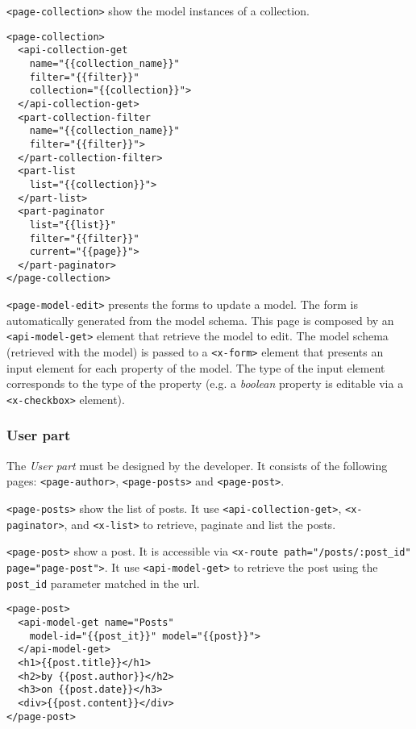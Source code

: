 \texttt{<page-collection>} show the model instances of a collection.

\begin{lstlisting}[language=HTML5]
<page-collection>
  <api-collection-get 
    name="{{collection_name}}" 
    filter="{{filter}}"
    collection="{{collection}}">
  </api-collection-get>
  <part-collection-filter 
    name="{{collection_name}}"  
    filter="{{filter}}">
  </part-collection-filter>
  <part-list 
    list="{{collection}}">
  </part-list>
  <part-paginator 
    list="{{list}}" 
    filter="{{filter}}"
    current="{{page}}">
  </part-paginator>
</page-collection>
\end{lstlisting}

\vspace{0.2cm}

\texttt{<page-model-edit>} presents the forms to update a model.
The form is automatically generated from the model schema.
This page is composed by an \texttt{<api-model-get>} element that retrieve the model to edit. The model schema (retrieved with the model) is passed to a \texttt{<x-form>} element that presents an input element for each property of the model. The type of the input element corresponds to the type of the property (e.g. a \emph{boolean} property is editable via a \texttt{<x-checkbox>} element).

\subsubsection{User part}
The \emph{User part} must be designed by the developer.
It consists of the following pages: \texttt{<page-author>}, \texttt{<page-posts>} and \texttt{<page-post>}. 

\vspace{0.2cm}

\texttt{<page-posts>} show the list of posts. It use \texttt{<api-collection-get>}, \texttt{<x-paginator>}, and \texttt{<x-list>} to retrieve, paginate and list the posts.

\vspace{0.2cm}

\texttt{<page-post>} show a post. It is accessible via 
\texttt{<x-route path="/posts/:post\_id" page="page-post">}. It use \texttt{<api-model-get>} to retrieve the post using the \texttt{post\_id} parameter matched in the url.

\begin{lstlisting}[language=HTML5]
<page-post>
  <api-model-get name="Posts" 
    model-id="{{post_it}}" model="{{post}}">
  </api-model-get>
  <h1>{{post.title}}</h1>
  <h2>by {{post.author}}</h2>
  <h3>on {{post.date}}</h3>
  <div>{{post.content}}</div>
</page-post>
\end{lstlisting}
